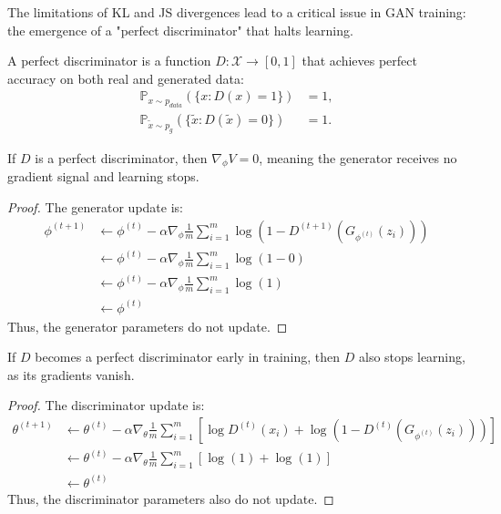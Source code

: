 The limitations of KL and JS divergences lead to a critical issue in GAN training: the emergence of a "perfect discriminator" that halts learning.

\begin{definition}%
  \label{def:perfect-discriminator}
  A \textnormal{\sffamily perfect discriminator} is a function $D: \mathcal{X} \to [0,1]$ that achieves perfect accuracy on both real and generated data:
  \begin{align}
    \mathbb{P}_{x \sim p_{data}}(\{x : D(x) = 1\}) &= 1, \\
    \mathbb{P}_{\tilde{x} \sim p_g}(\{\tilde{x} : D(\tilde{x}) = 0\}) &= 1.
  \end{align}
\end{definition}

\begin{theorem}%
  \label{thm:perfect-discriminator}
  If $D$ is a perfect discriminator, then $\nabla_\phi V = 0$, meaning the generator receives no gradient signal and learning stops.
\end{theorem}
\begin{proof}
  The generator update is:
  \begin{align}
    \phi^{(t+1)} &\gets \phi^{(t)} - \alpha \nabla_\phi \frac{1}{m} \sum_{i=1}^m \log(1 - D^{(t+1)}(G_{\phi^{(t)}}(z_i))) \\
    &\gets \phi^{(t)} - \alpha \nabla_\phi \frac{1}{m} \sum_{i=1}^m \log(1 - 0) \\
    &\gets \phi^{(t)} - \alpha \nabla_\phi \frac{1}{m} \sum_{i=1}^m \log(1) \\
    &\gets \phi^{(t)}
  \end{align}
  Thus, the generator parameters do not update.
\end{proof}

\begin{theorem}%
  \label{thm:too-early}
  If $D$ becomes a perfect discriminator early in training, then $D$ also stops learning, as its gradients vanish.
\end{theorem}
\begin{proof}
  The discriminator update is:
  \begin{align}
    \theta^{(t+1)} &\gets \theta^{(t)} - \alpha \nabla_\theta \frac{1}{m} \sum_{i=1}^m \left[ \log D^{(t)}(x_i) + \log(1 - D^{(t)}(G_{\phi^{(t)}}(z_i))) \right] \\
    &\gets \theta^{(t)} - \alpha \nabla_\theta \frac{1}{m} \sum_{i=1}^m \left[ \log(1) + \log(1) \right] \\
    &\gets \theta^{(t)}
  \end{align}
  Thus, the discriminator parameters also do not update.
\end{proof}

